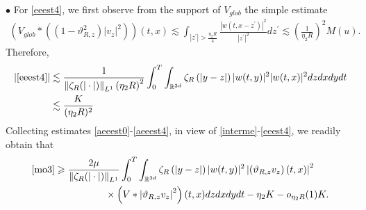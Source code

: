 \documentclass[reqno,11pt]{amsart}
\theoremstyle{plain}
\theoremstyle{definition}
\numberwithin{equation}{section}
\numberwithin{theorem}{section}
\def\geq{\geqslant}
\begin{document}
$\bullet$ For \eqref{eeest4}, we first observe from the support of $V_{glob}$ the simple estimate
\begin{align*}
\left(V_{glob} *\left(\left(1-\vartheta_{R,  z}^{2}\right)\left|v_{z}\right|^{2}\right)\right)(t, x)  \lesssim \int_{\left|z^{\prime}\right|>\frac{\eta_{2} R}{4}} \frac{\left|w\left(t, x-z^{\prime}\right)\right|^{2}}{\left|z^{\prime}\right|^{2}} d z^{\prime}\lesssim\left(\frac{1}{\eta_{2} R}\right)^{2} M(u). 
\end{align*}
Therefore,
\begin{align}
|\eqref{eeest4}| &\lesssim \frac{1}{\left\|\zeta_{R}(|\cdot|)\right\|_{L^{1}}\left(\eta_{2} R\right)^{2}} \int_{0}^{T} \int_{\mathbb{R}^{3d}}  \zeta_{R}\left(\left| y-z\right|\right)|w(t, y)|^{2}|w(t, x)|^{2} d z d x d y d t \notag\\
& \lesssim \frac{K}{(\eta_2 R)^2}\label{aeeest4}
\end{align}
Collecting estimates \eqref{aeeest0}-\eqref{aeeest4}, in view of \eqref{interme}-\eqref{eeest4}, we readily obtain that
\begin{align}
    \eqref{mo3}&\geq \frac{2\mu}{\left\|\zeta_{R}(|\cdot|)\right\|_{L^{1}}} \int_{0}^{T} \int_{\mathbb{R}^{3d}}  \zeta_{R}\left(\left| y-z\right|\right)|w(t, y)|^{2}\left|\left(\vartheta_{R,z} v_{z}\right)(t, x)\right|^{2}\notag\\
    &\hspace{12ex}\times \left(V *\left|\vartheta_{R,z} v_{z}\right|^{2}\right)(t, x) d z d x d y d t-\eta_2 K-o_{\eta_2R}(1)K.\label{F-est5}
\end{align}
\end{document}
